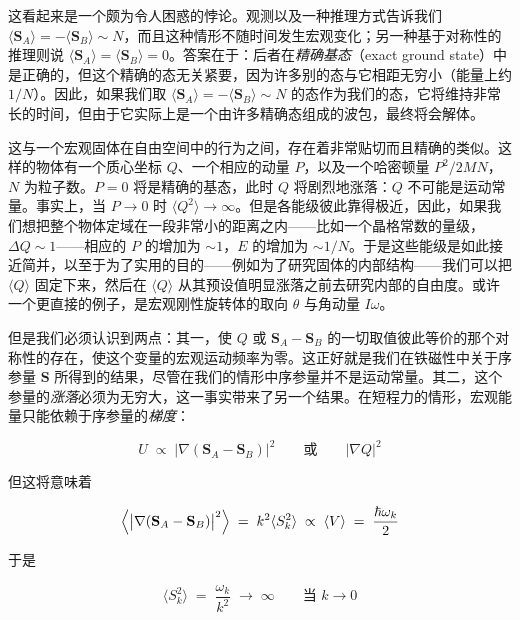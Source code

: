 这看起来是一个颇为令人困惑的悖论。观测以及一种推理方式告诉我们 $\langle \mathbf{S}_A\rangle = -\langle \mathbf{S}_B\rangle \sim N$，而且这种情形不随时间发生宏观变化；另一种基于对称性的推理则说 $\langle \mathbf{S}_A\rangle = \langle \mathbf{S}_B\rangle = 0$。答案在于：后者在\emph{精确基态}（exact ground state）中是正确的，但这个精确的态无关紧要，因为许多别的态与它相距无穷小（能量上约 $1/N$）。因此，如果我们取 $\langle \mathbf{S}_A\rangle = -\langle \mathbf{S}_B\rangle \sim N$ 的态作为我们的态，它将维持非常长的时间，但由于它实际上是一个由许多精确态组成的波包，最终将会解体。

这与一个宏观固体在自由空间中的行为之间，存在着非常贴切而且精确的类似。这样的物体有一个质心坐标 $Q$、一个相应的动量 $P$，以及一个哈密顿量 $P^2/2MN$，$N$ 为粒子数。$P=0$ 将是精确的基态，此时 $Q$ 将剧烈地涨落：$Q$ 不可能是运动常量。事实上，当 $P\to 0$ 时 $\langle Q^2\rangle\to\infty$。但是各能级彼此靠得极近，因此，如果我们想把整个物体定域在一段非常小的距离之内——比如一个晶格常数的量级，$\Delta Q\sim 1$——相应的 $P$ 的增加为 $\sim 1$，$E$ 的增加为 $\sim 1/N$。于是这些能级是如此接近简并，以至于为了实用的目的——例如为了研究固体的内部结构——我们可以把 $\langle Q\rangle$ 固定下来，然后在 $\langle Q\rangle$ 从其预设值明显涨落之前去研究内部的自由度。或许一个更直接的例子，是宏观刚性旋转体的取向 $\theta$ 与角动量 $I\omega$。

但是我们必须认识到两点：其一，使 $Q$ 或 $\mathbf{S}_A - \mathbf{S}_B$ 的一切取值彼此等价的那个对称性的存在，使这个变量的宏观运动频率为零。这正好就是我们在铁磁性中关于序参量 $\mathbf{S}$ 所得到的结果，尽管在我们的情形中序参量并不是运动常量。其二，这个参量的\emph{涨落}必须为无穷大，这一事实带来了另一个结果。在短程力的情形，宏观能量只能依赖于序参量的\emph{梯度}：

\begin{equation*}
U \;\propto\; \bigl|\nabla\left(\mathbf{S}_A - \mathbf{S}_B\right)\bigr|^2 \qquad\text{或}\qquad \bigl|\nabla Q\bigr|^2
\end{equation*}

但这将意味着

\begin{equation*}
\Bigl\langle\bigl|\nabla(\mathbf{S}_A - \mathbf{S}_B)\bigr|^2\Bigr\rangle \;=\; k^2\langle S_k^2\rangle \;\propto\; \langle V\rangle \;=\; \frac{\hbar\omega_k}{2}
\end{equation*}

于是

\begin{equation*}
\langle S_k^2\rangle \;=\; \frac{\omega_k}{k^2} \;\to\; \infty \qquad\text{当 } k\to 0
\end{equation*}

